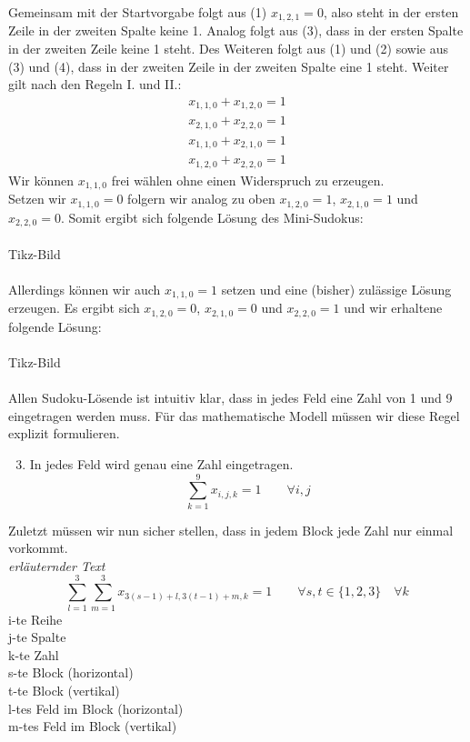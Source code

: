 Gemeinsam mit der Startvorgabe folgt aus (1) $x_{1,2,1}=0$, also steht in der ersten Zeile in der zweiten Spalte keine 1. Analog folgt aus (3), dass in der ersten Spalte in der zweiten Zeile keine 1 steht. Des Weiteren folgt aus (1) und (2) sowie aus (3) und (4), dass in der zweiten Zeile in der zweiten Spalte eine 1 steht. Weiter gilt nach den Regeln I. und II.:
\begin{align}
x_{1,1,0} + x_{1,2,0} = 1\\
x_{2,1,0} + x_{2,2,0} = 1\\
x_{1,1,0} + x_{2,1,0} = 1\\
x_{1,2,0} + x_{2,2,0} = 1
\end{align}
Wir können $x_{1,1,0}$ frei wählen ohne einen Widerspruch zu erzeugen.\\
Setzen wir $x_{1,1,0}=0$ folgern wir analog zu oben $x_{1,2,0}=1$, $x_{2,1,0}=1$ und $x_{2,2,0}=0$. Somit ergibt sich folgende Lösung des Mini-Sudokus:\\
\ \\
Tikz-Bild\\
\ \\
Allerdings können wir auch $x_{1,1,0}=1$ setzen und eine (bisher) zulässige Lösung erzeugen. Es ergibt sich $x_{1,2,0}=0$, $x_{2,1,0}=0$ und $x_{2,2,0}=1$ und wir erhaltene folgende Lösung:\\
\ \\
Tikz-Bild\\
\ \\
Allen Sudoku-Lösende ist intuitiv klar, dass in jedes Feld eine Zahl von 1 und 9 eingetragen werden muss. Für das mathematische Modell müssen wir diese Regel explizit formulieren.
\begin{enumerate}
\setcounter{enumi}{2}
\item In jedes Feld wird genau eine Zahl eingetragen.\\
$$ \sum_{k=1}^{9}{x_{i,j,k}}=1 \qquad \forall {i,j}$$
\end{enumerate}
Zuletzt müssen wir nun sicher stellen, dass in jedem Block jede Zahl nur einmal vorkommt.\\
\emph{erläuternder Text}\\
$$ \sum_{l=1}^{3} \sum_{m=1}^{3} {x_{3(s-1)+l, 3(t-1)+m, k}} =1 \qquad \forall s,t \in \{1,2,3\} \quad \forall k$$
i-te Reihe\\
j-te Spalte\\
k-te Zahl\\
s-te Block (horizontal)\\
t-te Block (vertikal)\\
l-tes Feld im Block (horizontal)\\
m-tes Feld im Block (vertikal)

